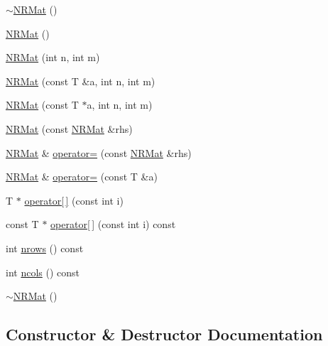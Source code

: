 \begin{DoxyCompactItemize}
\mbox{\hyperlink{classNR_1_1NRMat_a8b6826b7a7556a397ee7d7ad382e5dae}{$\sim$\+N\+R\+Mat}} ()
\item 
\mbox{\hyperlink{classNR_1_1NRMat_abcaca2687429fc0f26cde34647f7c981}{N\+R\+Mat}} ()
\item 
\mbox{\hyperlink{classNR_1_1NRMat_a52799868d76fb74a2d73b8d8291a9215}{N\+R\+Mat}} (int n, int m)
\item 
\mbox{\hyperlink{classNR_1_1NRMat_a31a0ecf81920c576b25e3c49bfa5e444}{N\+R\+Mat}} (const T \&a, int n, int m)
\item 
\mbox{\hyperlink{classNR_1_1NRMat_a30ddcc485a9e735b1fafbb56022fdc3a}{N\+R\+Mat}} (const T $\ast$a, int n, int m)
\item 
\mbox{\hyperlink{classNR_1_1NRMat_a7ad1dc6f56c44d5d0a7b595d48206cfa}{N\+R\+Mat}} (const \mbox{\hyperlink{classNR_1_1NRMat}{N\+R\+Mat}} \&rhs)
\item 
\mbox{\hyperlink{classNR_1_1NRMat}{N\+R\+Mat}} \& \mbox{\hyperlink{classNR_1_1NRMat_aba1c1ba10bf1b6ae9c2b78273e575dc4}{operator=}} (const \mbox{\hyperlink{classNR_1_1NRMat}{N\+R\+Mat}} \&rhs)
\item 
\mbox{\hyperlink{classNR_1_1NRMat}{N\+R\+Mat}} \& \mbox{\hyperlink{classNR_1_1NRMat_a6a8155b47cfdfb634440ad6600120087}{operator=}} (const T \&a)
\item 
T $\ast$ \mbox{\hyperlink{classNR_1_1NRMat_a387bf9be7d9606ea60e697c31c73df53}{operator\mbox{[}$\,$\mbox{]}}} (const int i)
\item 
const T $\ast$ \mbox{\hyperlink{classNR_1_1NRMat_a260aec593a5ef0c2166f6f4816ddfd2c}{operator\mbox{[}$\,$\mbox{]}}} (const int i) const
\item 
int \mbox{\hyperlink{classNR_1_1NRMat_aacebd802ca3dea0e0079a8dd27f7102c}{nrows}} () const
\item 
int \mbox{\hyperlink{classNR_1_1NRMat_ad6c5ecfb47d80c934bedeb7ea395fd84}{ncols}} () const
\item 
\mbox{\hyperlink{classNR_1_1NRMat_a8b6826b7a7556a397ee7d7ad382e5dae}{$\sim$\+N\+R\+Mat}} ()
\end{DoxyCompactItemize}


\subsection{Constructor \& Destructor Documentation}
\mbox{\label{classNR_1_1NRMat_abcaca2687429fc0f26cde34647f7c981}} 

